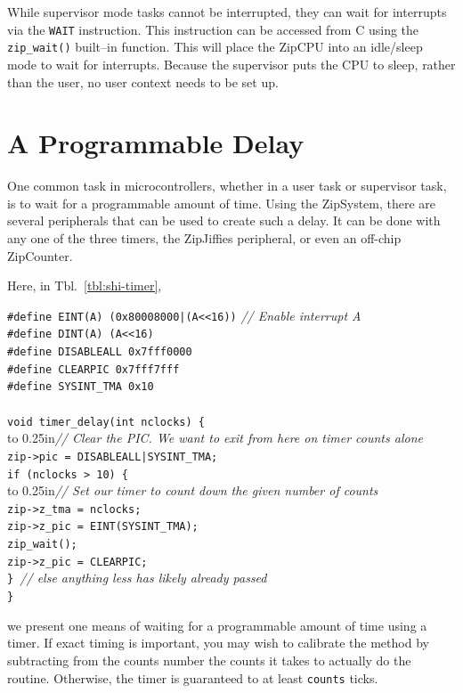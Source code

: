 \documentclass{gqtekspec}
\begin{document}
While supervisor mode tasks cannot be interrupted, they can wait for
interrupts via the {\tt WAIT} instruction.  This instruction can be accessed
from C using the {\tt zip\_wait()} built--in function.  This will place the
ZipCPU into an idle/sleep mode to wait for interrupts.  Because the
supervisor puts the CPU to sleep, rather than the user, no user context
needs to be set up.
\section{A Programmable Delay}
One common task in microcontrollers, whether in a user task or supervisor
task, is to wait for a programmable amount of time.  Using the ZipSystem,
there are several peripherals that can be used to create such a delay.
It can be done with any one of the three timers, the ZipJiffies peripheral, or
even an off-chip ZipCounter.

Here, in Tbl.~\ref{tbl:shi-timer},
\begin{table}\begin{center}
\begin{tabbing}
{\tt \#define EINT(A) (0x80008000|(A<<16))} \= {\em // Enable interrupt A}\\
{\tt \#define DINT(A) (A<<16)} \\
{\tt \#define DISABLEALL 0x7fff0000} \\
{\tt \#define CLEARPIC 0x7fff7fff} \\
{\tt \#define SYSINT\_TMA 0x10} \\
\\
{\tt void timer\_delay(int nclocks) \{} \\
\hbox to 0.25in{}\= {\em // Clear the PIC.  We want to exit from here on timer counts alone}\\
	\> {\tt zip->pic = DISABLEALL|SYSINT\_TMA;}\\
	\> {\tt if (nclocks > 10) \{}\\
	\> \hbox to 0.25in{}\= {\em // Set our timer to count down the given number of counts}\\
	\> \> {\tt zip->z\_tma = nclocks;} \\
	\> \> {\tt zip->z\_pic = EINT(SYSINT\_TMA);} \\
	\> \> {\tt zip\_wait();} \\
	\> \> {\tt zip->z\_pic = CLEARPIC;} \\
	\> {\tt \} }{\em // else anything less has likely already passed} \\
{\tt \}}\\
\end{tabbing}
\caption{Waiting on a timer}\label{tbl:shi-timer}
\end{center}\end{table}
we present one means of waiting for a programmable amount of time using a
timer.  If exact timing is important, you may wish to calibrate the method
by subtracting from the counts number the counts it takes to actually do the
routine.  Otherwise, the timer is guaranteed to at least {\tt counts}
ticks.
\end{document}
